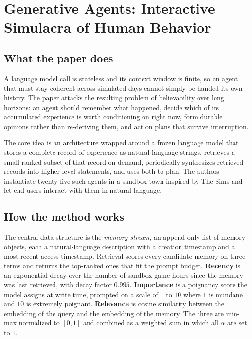 \section{Generative Agents: Interactive Simulacra of Human Behavior}

\subsection{What the paper does}

A language model call is stateless and its context window is finite, so an agent that must stay coherent across simulated days cannot simply be handed its own history. The paper attacks the resulting problem of believability over long horizons: an agent should remember what happened, decide which of its accumulated experience is worth conditioning on right now, form durable opinions rather than re-deriving them, and act on plans that survive interruption.

The core idea is an architecture wrapped around a frozen language model that stores a complete record of experience as natural-language strings, retrieves a small ranked subset of that record on demand, periodically synthesizes retrieved records into higher-level statements, and uses both to plan. The authors instantiate twenty five such agents in a sandbox town inspired by The Sims and let end users interact with them in natural language.

\subsection{How the method works}

The central data structure is the \emph{memory stream}, an append-only list of memory objects, each a natural-language description with a creation timestamp and a most-recent-access timestamp. Retrieval scores every candidate memory on three terms and returns the top-ranked ones that fit the prompt budget. \textbf{Recency} is an exponential decay over the number of sandbox game hours since the memory was last retrieved, with decay factor $0.995$. \textbf{Importance} is a poignancy score the model assigns at write time, prompted on a scale of $1$ to $10$ where $1$ is mundane and $10$ is extremely poignant. \textbf{Relevance} is cosine similarity between the embedding of the query and the embedding of the memory. The three are min-max normalized to $[0,1]$ and combined as a weighted sum in which all $\alpha$ are set to $1$.

